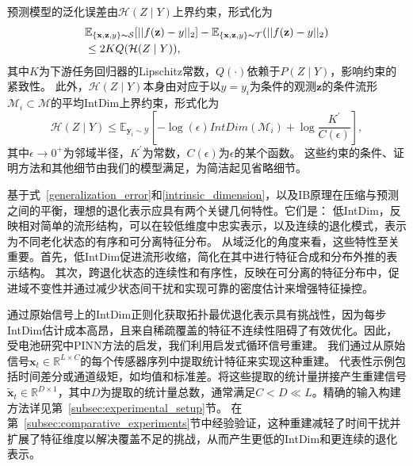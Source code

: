 \documentclass[UTF8,lettersize,journal]{IEEEtran}
\begin{document}
预测模型的泛化误差由$\mathcal{H}(Z \mid Y)$上界约束，形式化为
\begin{align}
    & \mathbb{E}_{\{\mathbf{x},\mathbf{z},y\}\thicksim \mathcal{S}}[||f(\mathbf{z})-{y}||_2] -\mathbb{E}_{\{\mathbf{x},\mathbf{z},y\}\thicksim \mathcal{T}}(||f(\mathbf{z})-{y}||_2) \notag \\
    & \leq 2KQ(\mathcal{H}(Z \mid Y)), \label{generalization_error}
\end{align}
其中$K$为下游任务回归器的Lipschitz常数，$Q(\cdot)$依赖于$P(Z \mid Y)$，影响约束的紧致性。
此外，$\mathcal{H}(Z \mid Y)$本身由对应于以$y = y_{i}$为条件的观测$\boldsymbol{z}$的条件流形$\mathcal{M}_i\subset\mathcal{M}$的平均IntDim上界约束，形式化为
\begin{equation}
    \mathcal{H}(Z \mid Y) \leq \mathbb{E}_{\mathbf{y}_{i} \sim \mathcal{Y}}[-\log(\epsilon)IntDim(\mathcal{M}_i)+\log\frac{K^{\prime}}{C(\epsilon)}],
    \label{intrinsic_dimension} 
\end{equation}
其中$\epsilon \to 0^{+}$为邻域半径，$K^{\prime}$为常数，$C(\epsilon)$为$\epsilon$的某个函数。
这些约束的条件、证明方法和其他细节\cite{Ghosh_Motani_2023, 10.5555/3692070.3694510}由我们的模型满足，为简洁起见省略细节。

基于式~\eqref{generalization_error}和\eqref{intrinsic_dimension}，以及IB原理在压缩与预测之间的平衡，理想的退化表示应具有两个关键几何特性。它们是：
低IntDim，反映相对简单的流形结构，可以在较低维度中忠实表示，以及连续的退化模式，表示为不同老化状态的有序和可分离特征分布。
从域泛化的角度来看，这些特性至关重要。首先，低IntDim促进流形收缩，简化在其中进行特征合成和分布外推的表示结构。
其次，跨退化状态的连续性和有序性，反映在可分离的特征分布中，促进域不变性并通过减少状态间干扰和实现可靠的密度估计来增强特征操控。

通过原始信号上的IntDim正则化获取拓扑最优退化表示具有挑战性，因为每步IntDim估计成本高昂，且来自稀疏覆盖的特征不连续性阻碍了有效优化。因此，受电池研究中PINN方法\cite{wang2024physics, 10251604}的启发，我们利用启发式循环信号重建。
我们通过从原始信号$\boldsymbol{x}_{t} \in \mathbb{R} ^ {L \times C}$的每个传感器序列中提取统计特征来实现这种重建。
代表性示例包括时间差分或通道级矩，如均值和标准差。将这些提取的统计量拼接产生重建信号$\boldsymbol{\widetilde{x}}_{t} \in \mathbb{R} ^ {D \times 1}$，其中$D$为提取的统计量总数，通常满足$C < D \ll L$。精确的输入构建方法详见第~\ref{subsec:experimental_setup}节。
在第~\ref{subsec:comparative_experiments}节中经验验证，这种重建减轻了时间干扰并扩展了特征维度以解决覆盖不足的挑战，从而产生更低的IntDim和更连续的退化表示。
\end{document}
